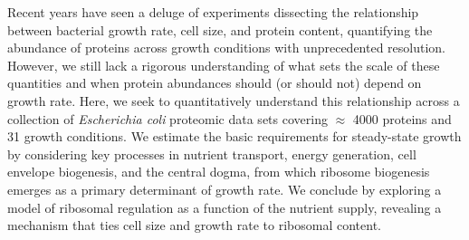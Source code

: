 Recent years have seen a deluge of experiments dissecting the relationship
between bacterial growth rate, cell size, and protein content, quantifying
the abundance of proteins across growth conditions with unprecedented
resolution. However, we still lack a rigorous understanding of what sets the
scale of these quantities and when protein abundances should (or should not)
depend on growth rate. Here, we seek to quantitatively understand this
relationship across a collection of \textit{Escherichia coli} proteomic data
sets covering $\approx$ 4000 proteins and 31 growth conditions. We estimate
the basic requirements for steady-state growth by considering key processes
in nutrient transport, energy generation, cell envelope biogenesis, and the
central dogma, from which ribosome biogenesis emerges as a primary
determinant of growth rate. We conclude by exploring a model of ribosomal
regulation as a function of the nutrient supply, revealing a mechanism that
ties cell size and growth rate to ribosomal content.
